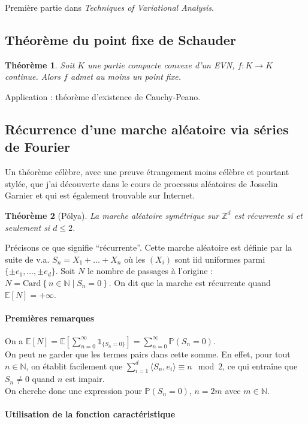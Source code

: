 \documentclass[a4paper, 11pt]{article}
\def\Z{\mathbb{Z}}
\def\N{\mathbb{N}}
\def\P{\mathbb{P}}
\def\E{\mathbb{E}}
\def\Indic{\mathbb{1}}
\newtheorem*{theorem}{Théorème}
\begin{document}
Première partie dans \emph{Techniques of Variational Analysis}.

\subsection{Théorème du point fixe de Schauder}

\begin{theorem}
  Soit $K$ une partie compacte convexe d'un EVN, $f : K \to K$ continue. Alors
  $f$ admet au moins un point fixe.
\end{theorem}
Application : théorème d'existence de Cauchy-Peano.


\subsection{Récurrence d'une marche aléatoire via séries de Fourier}

Un théorème célèbre, avec une preuve étrangement moins célèbre et pourtant
stylée, que j'ai découverte dans le cours de processus aléatoires de Josselin
Garnier et qui est également trouvable sur Internet.

\begin{theorem}[Pólya]
  La marche aléatoire symétrique sur $\Z^d$ est \emph{récurrente} si et
  seulement si $d \leq 2$.
\end{theorem}

Précisons ce que signifie \enquote{récurrente}. Cette marche aléatoire est
définie par la suite de v.a. $S_n = X_1 + \ldots + X_n$ où les $(X_i)$ sont iid
uniformes parmi $\{\pm e_1, \ldots, \pm e_d\}$. Soit $N$ le nombre de passages à
l'origine : $N = \mathrm{Card}\left\{n \in \N \mid S_n = 0\right\}$. On dit que
la marche est récurrente quand $\E[N] = +\infty$.


\paragraph{Premières remarques} On a $\displaystyle \E[N] = \E\left[
  \sum_{n=0}^\infty \Indic_{\{S_n = 0\}} \right] =
\sum_{n=0}^\infty \P(S_n = 0)$.\\
On peut ne garder que les termes pairs dans cette somme. En effet, pour tout $n
\in \N$, on établit facilement que $\sum_{i=1}^d \langle S_n, e_i \rangle \equiv
n \mod 2$, ce qui entraîne que $S_n \neq 0$ quand $n$ est impair.\\
On cherche donc une expression pour $\P(S_n = 0)$, $n = 2m$ avec $m \in \N$.

\paragraph{Utilisation de la fonction caractéristique}
\end{document}

